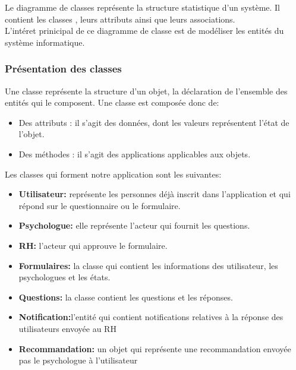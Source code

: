 \documentclass[12]{article}
\begin{document}
Le diagramme de classes représente la structure statistique d'un système. Il contient les classes , leurs attributs ainsi que leurs associations.\\

L'intéret prinicipal de ce diagramme de classe est de modéliser les entités du système informatique.\\

\subsubsection{Présentation des classes}

Une classe représente la structure d'un objet, la déclaration de l'ensemble des entités qui le composent. Une classe est composée donc de:\\

\begin{itemize}
\item Des attributs : il s'agit des données, dont les valeurs représentent l'état de l'objet.
\item Des méthodes : il s'agit des applications applicables aux objets.
\end{itemize}

Les classes qui forment notre application sont les suivantes:

\begin{itemize}
\item \textbf{Utilisateur:} représente les personnes déjà inscrit dans l'application et qui répond sur le questionnaire ou le formulaire.
\item \textbf{Psychologue:} elle représente l'acteur qui fournit les questions.

\item \textbf{RH:} l'acteur qui approuve  le formulaire.

\item \textbf{Formulaires:} la classe qui contient les informations des utilisateur, les psychologues et les états.

\item \textbf{Questions:} la classe contient les questions et les réponses.

\item \textbf{Notification:}l'entité qui  contient notifications relatives à la réponse des utilisateurs envoyée 
au RH
\item   \textbf{Recommandation:} un objet qui représente une recommandation envoyée pas le psychologue à l'utilisateur
\end{itemize}
\end{document}
